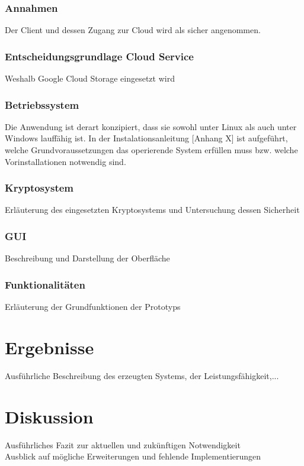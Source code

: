 \documentclass[12pt,a4paper,bibliography=totocnumbered,listof=totocnumbered]{scrartcl}
\begin{document}
\subsubsection{Annahmen}
Der Client und dessen Zugang zur Cloud wird als sicher angenommen.
\subsubsection{Entscheidungsgrundlage Cloud Service}
Weshalb Google Cloud Storage eingesetzt wird
\subsubsection{Betriebssystem}
Die Anwendung ist derart konzipiert, dass sie sowohl unter Linux als auch unter Windows lauffähig ist. In der Instalationsanleitung [Anhang X] ist aufgeführt, welche Grundvoraussetzungen das operierende System erfüllen muss bzw. welche Vorinstallationen notwendig sind.

 
\subsubsection{Kryptosystem}
Erläuterung des eingesetzten Kryptosystems und Untersuchung dessen Sicherheit\\
\subsubsection{GUI}
Beschreibung und Darstellung der Oberfläche
\subsubsection{Funktionalitäten}
Erläuterung der Grundfunktionen der Prototyps

\pagebreak

\section{Ergebnisse}
Ausführliche Beschreibung des erzeugten Systems, der Leistungsfähigkeit,...

\pagebreak

\section{Diskussion}
Ausführliches Fazit zur aktuellen und zukünftigen Notwendigkeit\\
Ausblick auf mögliche Erweiterungen und fehlende Implementierungen
\end{document}

